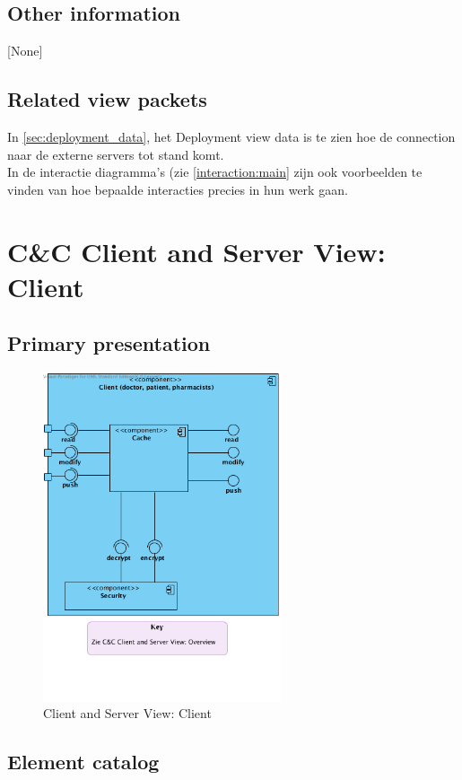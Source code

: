 \documentclass[a4paper,10pt]{article}
\begin{document}
\subsection{Other information}
[None]

\subsection{Related view packets}
In \ref{sec:deployment_data}, het Deployment view data is te zien hoe de connection naar de externe servers tot stand komt.\\
In de interactie diagramma's (zie \ref{interaction:main} zijn ook voorbeelden te vinden van hoe bepaalde interacties precies in hun werk gaan.


\clearpage
\section{C\&C Client and Server View: Client}
\label{Client and Server View: Client}

\subsection{Primary presentation}

\begin{figure}[!h]
  \includegraphics[width=70mm]{../images/ClientServer_Client.png}
  \caption{Client and Server View: Client}
\end{figure}

\subsection{Element catalog}
\end{document}
